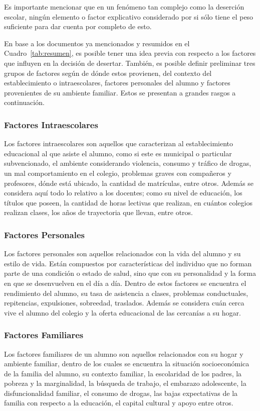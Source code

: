 
Es importante mencionar que en un fenómeno tan complejo como la deserción escolar, ningún elemento o factor explicativo considerado por si sólo tiene el peso suficiente para dar cuenta por completo de esto. 

En base a los documentos ya mencionados y resumidos en el Cuadro~\ref{tab:resumen}, es posible tener una idea previa con respecto a los factores que influyen en la decisión de desertar. También, es posible definir preliminar tres grupos de factores según de dónde estos provienen, del contexto del establecimiento o intraescolares, factores personales del alumno y factores provenientes de su ambiente familiar. Estos se presentan a grandes rasgos a continuación. 

\subsubsection{Factores Intraescolares}
Los factores intraescolares son aquellos que caracterizan al establecimiento educacional al que asiste el alumno, como si este es municipal o particular subvencionado, el ambiente considerando violencia, consumo y tráfico de drogas, un mal comportamiento en el colegio, problemas graves con compañeros y profesores, dónde está ubicado, la cantidad de matrículas, entre otros.  Además se considera aquí todo lo relativo a los docentes; como su nivel de educación, los títulos que poseen, la cantidad de horas lectivas que realizan, en cuántos colegios realizan clases, los años de trayectoria que llevan, entre otros. 
\subsubsection{Factores Personales}
Los factores personales son aquellos relacionados con la vida del alumno y su estilo de vida. Están compuestos por características del individuo que no forman parte de una condición o estado de salud, sino que con su personalidad y la forma en que se desenvuelven en el día a día. 
Dentro de estos factores se encuentra el rendimiento del alumno, su tasa de asistencia a clases, problemas conductuales, repitencias, expulsiones, sobreedad, traslados. Además se considera cuán cerca vive el alumno del colegio y la oferta educacional de las cercanías a su hogar. 
\subsubsection{Factores Familiares}
Los factores familiares de un alumno son aquellos relacionados con su hogar y ambiente familiar, dentro de los cuales se encuentra la situación socioeconómica de la familia del alumno, su contexto familiar, la escolaridad de los padres, la pobreza y la marginalidad, la búsqueda de trabajo, el embarazo adolescente, la disfuncionalidad familiar, el consumo de drogas, las bajas expectativas de la familia con respecto a la educación, el capital cultural y apoyo entre otros.

